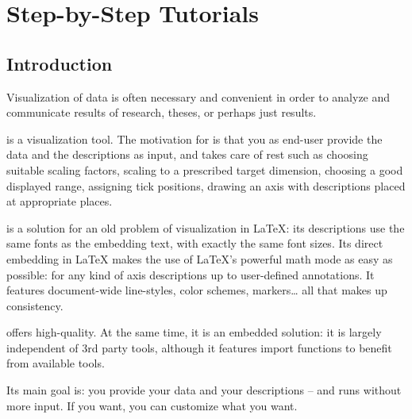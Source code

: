 
\chapter{Step-by-Step Tutorials}
{%
%


\section{Introduction}

Visualization of data is often necessary and convenient in order to analyze and
communicate results of research, theses, or perhaps just results.

\PGFPlots{} is a visualization tool. The motivation for \PGFPlots{} is that you
as end-user provide the data and the descriptions as input, and \PGFPlots{}
takes care of rest such as choosing suitable scaling factors, scaling to a
prescribed target dimension, choosing a good displayed range, assigning tick
positions, drawing an axis with descriptions placed at appropriate places.

\PGFPlots{} is a solution for an old problem of visualization in \LaTeX{}: its
descriptions use the same fonts as the embedding text, with exactly the same
font sizes. Its direct embedding in \LaTeX{} makes the use of \LaTeX{}'s
powerful math mode as easy as possible: for any kind of axis descriptions up to
user-defined annotations. It features document-wide line-styles, color schemes,
markers\ldots{} all that makes up consistency.

\PGFPlots{} offers high-quality. At the same time, it is an embedded solution:
it is largely independent of 3rd party tools, although it features import
functions to benefit from available tools.

Its main goal is: you provide your data and your descriptions -- and
\PGFPlots{} runs without more input. If you want, you can customize what you
want.






}%
\endinput   \todosp{does this "endinput" have a special meaning?}
